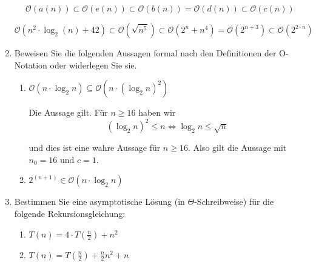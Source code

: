 \documentclass{bschlangaul-aufgabe}
\begin{document}
\begin{enumerate}
\begin{bAntwort}
\begin{displaymath}
\mathcal{O}(a (n)) \subset \mathcal{O}(e(n)) \subset \mathcal{O}(b(n)) = \mathcal{O}(d(n)) \subset \mathcal{O}(c(n))
\end{displaymath}

\begin{displaymath}
\mathcal{O}(n^2 \cdot \log_2(n) + 42) \subset
\mathcal{O}(\sqrt{n^5}) \subset
\mathcal{O}(2^n + n^4) =
\mathcal{O}(2^{n+3}) \subset
\mathcal{O}(2^{2 \cdot n})
\end{displaymath}
\end{bAntwort}


\item Beweisen Sie die folgenden Aussagen formal nach den Definitionen
der O-Notation oder widerlegen Sie sie.

\begin{enumerate}


\item $\mathcal{O}(n \cdot \log_2 n) \subseteq \mathcal{O}(n \cdot (\log_2 n)^2)$

\begin{bAntwort}
Die Aussage gilt.
Für $n \geq 16$ haben wir
\begin{displaymath}
(\log_2 n)^2 \leq n \Leftrightarrow \log_2 n  \leq \sqrt n
\end{displaymath}

und dies ist eine wahre Aussage für $n \geq 16$. Also gilt die Aussage mit $n_0 = 16$ und $c = 1$.
\end{bAntwort}


\item $2^{(n+1)} \in \mathcal{O}(n \cdot \log_2 n)$
\end{enumerate}


\item Bestimmen Sie eine asymptotische Lösung (in $\Theta$-Schreibweise)
für die folgende Rekursionsgleichung:

\begin{enumerate}


\item $T(n) = 4 \cdot T(\frac{n}{2}) + n^2$


\item $T(n) =  T(\frac{n}{2}) +\frac{n}{2} n^2 + n$
\end{enumerate}

\end{enumerate}
\end{document}
